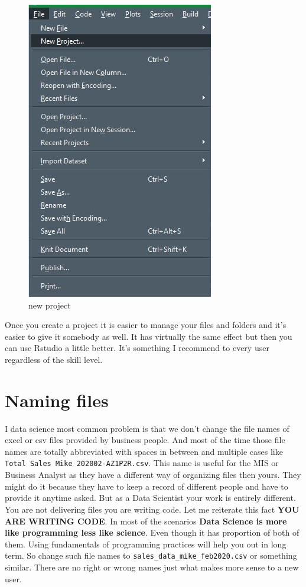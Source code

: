 \documentclass[
]{book}
\begin{document}
\begin{figure}
\centering
\includegraphics{./figures/scrn_new_project.jpg}
\caption{new project}
\end{figure}

Once you create a project it is easier to manage your files and folders and it's easier to give it somebody as well. It has virtually the same effect but then you can use Rstudio a little better. It's something I recommend to every user regardless of the skill level.

\hypertarget{naming-files}{%
\section{Naming files}\label{naming-files}}

I data science most common problem is that we don't change the file names of excel or csv files provided by business people. And most of the time those file names are totally abbreviated with spaces in between and multiple cases like \texttt{Total\ Sales\ Mike\ 202002-AZ1P2R.csv}. This name is useful for the MIS or Business Analyst as they have a different way of organizing files then yours. They might do it because they have to keep a record of different people and have to provide it anytime asked. But as a Data Scientist your work is entirely different. You are not delivering files you are writing code. Let me reiterate this fact \textbf{YOU ARE WRITING CODE}. In most of the scenarios \textbf{Data Science is more like programming less like science}. Even though it has proportion of both of them. Using fundamentals of programming practices will help you out in long term. So change such file names to \texttt{sales\_data\_mike\_feb2020.csv} or something similar. There are no right or wrong names just what makes more sense to a new user.
\end{document}
